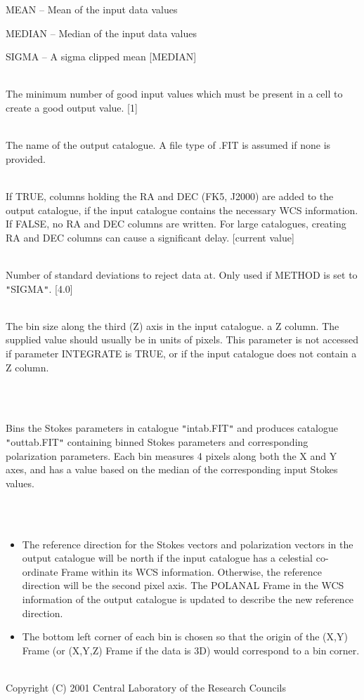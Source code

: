 \documentclass[twoside,11pt]{article}
\renewcommand{\_}{\texttt{\symbol{95}}}
\newlength{\sstexampleslength}
\newcommand{\sstexamples}[1]{
   \item[Examples:] \mbox{} \\
   \vspace{-3.5ex}
   \begin{description}
      #1
   \end{description}
}
\newcommand{\sstsubsection}[1]{ \item[{#1}] \mbox{} \\}
\newcommand{\sstexamplesubsection}[2]{\sloppy
\item[\parbox{\sstexampleslength}{\ssttt #1}] \mbox{} \vspace{1.0ex}
\\ #2 }
\newcommand{\sstnotes}[1]{\item[Notes:] \mbox{} \\[1.3ex] #1}
\newcommand{\sstdiytopic}[2]{\item[{\hspace{-0.35em}#1\hspace{-0.35em}:}]
\mbox{} \\[1.3ex] #2}
\newcommand{\sstitemlist}[1]{
  \mbox{} \\
  \vspace{-3.5ex}
  \begin{itemize}
     #1
  \end{itemize}
}
\newcommand{\sstitem}{\item}
\newcommand{\sstexamples}[1]{
      \item[Examples:] \\
      \begin{description}
         #1
      \end{description}
      \\
   }
\newcommand{\sstsubsection}[1]{\item[{#1}]}
\newcommand{\sstexamplesubsection}[2]{\item[{\ssttt #1}] #2}
\newcommand{\sstnotes}[1]{\item[Notes:] #1 }
\newcommand{\sstdiytopic}[2]{\item[{#1}] #2 }
\newcommand{\sstitemlist}[1]{
      \begin{itemize}
         #1
      \end{itemize}
      \\
   }
\newcommand{\sstitem}{\item}
\begin{document}
{{{{            \sstitem
               MEAN      -- Mean of the input data values

            \sstitem
               MEDIAN    -- Median of the input data values

            \sstitem
               SIGMA     -- A sigma clipped mean
            [MEDIAN]
         }
      }
      \sstsubsection{
         MINVAL = \_INTEGER (Read)
      }{
         The minimum number of good input values which must be present in
         a cell to create a good output value. [1]
      }
      \sstsubsection{
         OUT = LITERAL (Read)
      }{
         The name of the output catalogue. A file type of .FIT is assumed
         if none is provided.
      }
      \sstsubsection{
         RADEC = \_LOGICAL (Read)
      }{
         If TRUE, columns holding the RA and DEC (FK5, J2000) are added
         to the output catalogue, if the input catalogue contains the
         necessary WCS information. If FALSE, no RA and DEC columns are
         written. For large catalogues, creating RA and DEC columns can
         cause a significant delay. [current value]
      }
      \sstsubsection{
         SIGMAS = \_REAL (Read)
      }{
         Number of standard deviations to reject data at. Only used if
         METHOD is set to {\tt "}SIGMA{\tt "}. [4.0]
      }
      \sstsubsection{
         ZBOX = \_REAL (Read)
      }{
         The bin size along the third (Z) axis in the input catalogue.
         a Z column. The supplied value should usually be in units of pixels.
         This parameter is not accessed if parameter INTEGRATE is TRUE, or
         if the input catalogue does not contain a Z column.
      }
   }
   \sstexamples{
      \sstexamplesubsection{
         polbin intab outtab 4
      }{
         Bins the Stokes parameters in catalogue {\tt "}intab.FIT{\tt "} and produces
         catalogue {\tt "}outtab.FIT{\tt "} containing binned Stokes parameters and
         corresponding polarization parameters. Each bin measures 4 pixels
         along both the X and Y axes, and has a value based on the median
         of the corresponding input Stokes values.
      }
   }
   \sstnotes{
      \sstitemlist{

         \sstitem
         The reference direction for the Stokes vectors and polarization
         vectors in the output catalogue will be north if the input catalogue
         has a celestial co-ordinate Frame within its WCS information. Otherwise,
         the reference direction will be the second pixel axis. The POLANAL
         Frame in the WCS information of the output catalogue is updated to
         describe the new reference direction.

         \sstitem
         The bottom left corner of each bin is chosen so that the origin
         of the (X,Y) Frame (or (X,Y,Z) Frame if the data is 3D) would
         correspond to a bin corner.
      }
   }
   \sstdiytopic{
      Copyright
   }{
      Copyright (C) 2001 Central Laboratory of the Research Councils
   }
}
\end{document}
